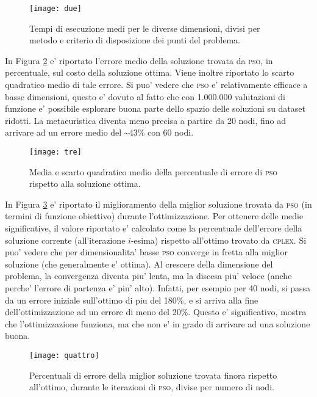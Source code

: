 \documentclass[
12pt, %
a4paper, %
oneside, %
headinclude,footinclude, %
BCOR5mm, %
]{scrartcl}
\begin{document}
\begin{figure}[H]
	\centering
	\texttt{[image: due]}
	\caption[]{Tempi di esecuzione medi per le diverse dimensioni, divisi per metodo e criterio di disposizione dei punti del problema. }
	\label{fig:due}
\end{figure}

In Figura \ref{fig:tre} e' riportato l'errore medio della soluzione trovata da \textsc{pso}, in percentuale, sul costo della soluzione ottima. Viene inoltre riportato lo scarto quadratico medio di tale errore. Si puo' vedere che \textsc{pso} e' relativamente efficace a basse dimensioni, questo e' dovuto al fatto che con 1.000.000 valutazioni di funzione e' possibile esplorare buona parte dello spazio delle soluzioni su dataset ridotti. La metaeuristica diventa meno precisa a partire da 20 nodi, fino ad arrivare ad un errore medio del \textasciitilde 43\% con 60 nodi.

\begin{figure}[htpb]
	\centering
	\texttt{[image: tre]}
	\caption[]{Media e scarto quadratico medio della percentuale di errore di \textsc{pso} rispetto alla soluzione ottima.}
	\label{fig:tre}
\end{figure}

In Figura \ref{fig:quattro} e' riportato il miglioramento della miglior soluzione trovata da \textsc{pso} (in termini di funzione obiettivo) durante l'ottimizzazione. Per ottenere delle medie significative, il valore riportato e' calcolato come la percentuale dell'errore della soluzione corrente (all'iterazione $i$-esima) rispetto all'ottimo trovato da \textsc{cplex}. Si puo' vedere che per dimensionalita' basse \textsc{pso} converge in fretta alla miglior soluzione (che generalmente e' ottima). Al crescere della dimensione del problema, la convergenza diventa piu' lenta, ma la discesa piu' veloce (anche perche' l'errore di partenza e' piu' alto). Infatti, per esempio per 40 nodi, si passa da un errore iniziale sull'ottimo di piu del 180\%, e si arriva alla fine dell'ottimizzazione ad un errore di meno del 20\%. Questo e' significativo, mostra che l'ottimizzazione funziona, ma che non e' in grado di arrivare ad una soluzione buona.

\begin{figure}[H]
	\centering
	\texttt{[image: quattro]}
	\caption[]{Percentuali di errore della miglior soluzione trovata finora rispetto all'ottimo, durante le iterazioni di \textsc{pso}, divise per numero di nodi.}
	\label{fig:quattro}
\end{figure}
\end{document}
